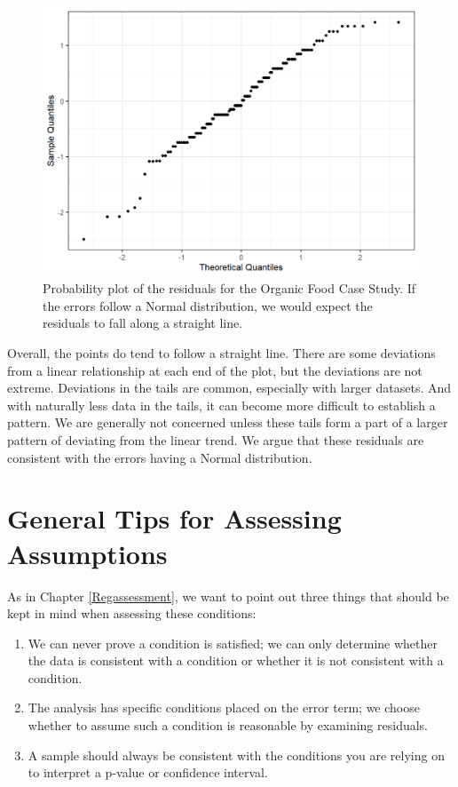 \documentclass[
]{book}
\providecommand{\tightlist}{%
  \setlength{\itemsep}{0pt}\setlength{\parskip}{0pt}}
\theoremstyle{plain}
\theoremstyle{mydefn}
\theoremstyle{myexmpl}
\theoremstyle{remark}
\begin{document}
\begin{figure}

{\centering \includegraphics[width=0.8\linewidth]{./Images/anovaassessment-normal-organic-1} 

}

\caption{Probability plot of the residuals for the Organic Food Case Study.  If the errors follow a Normal distribution, we would expect the residuals to fall along a straight line.}\label{fig:anovaassessment-normal-organic}
\end{figure}

Overall, the points do tend to follow a straight line. There are some deviations from a linear relationship at each end of the plot, but the deviations are not extreme. Deviations in the tails are common, especially with larger datasets. And with naturally less data in the tails, it can become more difficult to establish a pattern. We are generally not concerned unless these tails form a part of a larger pattern of deviating from the linear trend. We argue that these residuals are consistent with the errors having a Normal distribution.

\hypertarget{general-tips-for-assessing-assumptions-1}{%
\section{General Tips for Assessing Assumptions}\label{general-tips-for-assessing-assumptions-1}}

As in Chapter \ref{Regassessment}, we want to point out three things that should be kept in mind when assessing these conditions:

\begin{enumerate}
\def\labelenumi{\arabic{enumi}.}
\tightlist
\item
  We can never prove a condition is satisfied; we can only determine whether the data is consistent with a condition or whether it is not consistent with a condition.
\item
  The analysis has specific conditions placed on the error term; we choose whether to assume such a condition is reasonable by examining residuals.
\item
  A sample should always be consistent with the conditions you are relying on to interpret a p-value or confidence interval.
\end{enumerate}
\end{document}
